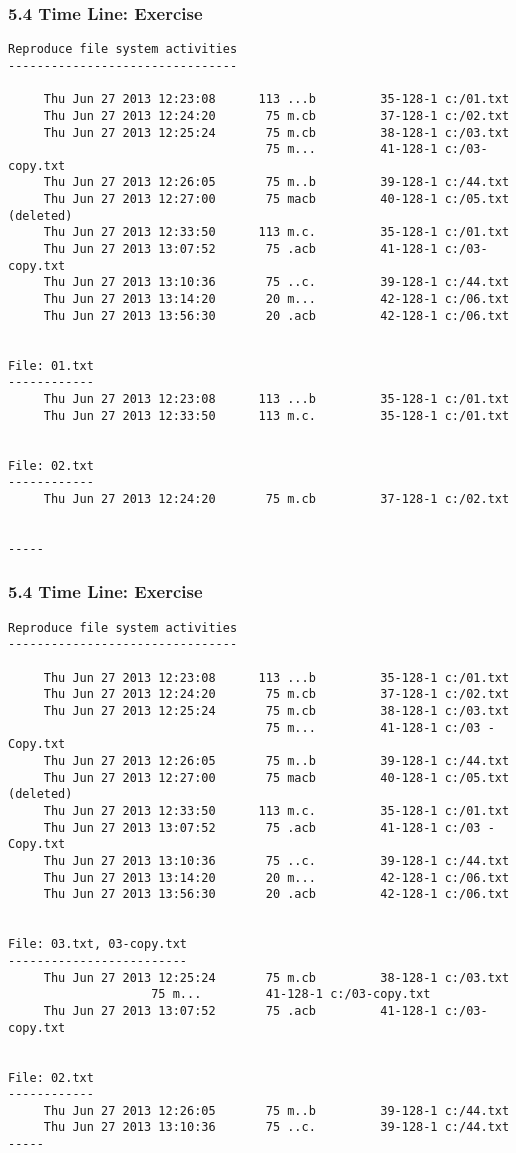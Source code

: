 \begin{frame}[fragile]
  \frametitle{5.4 Time Line: Exercise}
  \begin{lstlisting}[basicstyle=\tiny]
Reproduce file system activities
--------------------------------
  
     Thu Jun 27 2013 12:23:08      113 ...b         35-128-1 c:/01.txt
     Thu Jun 27 2013 12:24:20       75 m.cb         37-128-1 c:/02.txt
     Thu Jun 27 2013 12:25:24       75 m.cb         38-128-1 c:/03.txt
                                    75 m...         41-128-1 c:/03-copy.txt
     Thu Jun 27 2013 12:26:05       75 m..b         39-128-1 c:/44.txt
     Thu Jun 27 2013 12:27:00       75 macb         40-128-1 c:/05.txt (deleted)
     Thu Jun 27 2013 12:33:50      113 m.c.         35-128-1 c:/01.txt
     Thu Jun 27 2013 13:07:52       75 .acb         41-128-1 c:/03-copy.txt
     Thu Jun 27 2013 13:10:36       75 ..c.         39-128-1 c:/44.txt
     Thu Jun 27 2013 13:14:20       20 m...         42-128-1 c:/06.txt
     Thu Jun 27 2013 13:56:30       20 .acb         42-128-1 c:/06.txt


File: 01.txt
------------
     Thu Jun 27 2013 12:23:08      113 ...b         35-128-1 c:/01.txt
     Thu Jun 27 2013 12:33:50      113 m.c.         35-128-1 c:/01.txt


File: 02.txt
------------
     Thu Jun 27 2013 12:24:20       75 m.cb         37-128-1 c:/02.txt


-----
  \end{lstlisting}
\end{frame}


\begin{frame}[fragile]
  \frametitle{5.4 Time Line: Exercise}
  \begin{lstlisting}[basicstyle=\tiny]
Reproduce file system activities
--------------------------------
  
     Thu Jun 27 2013 12:23:08      113 ...b         35-128-1 c:/01.txt
     Thu Jun 27 2013 12:24:20       75 m.cb         37-128-1 c:/02.txt
     Thu Jun 27 2013 12:25:24       75 m.cb         38-128-1 c:/03.txt
                                    75 m...         41-128-1 c:/03 - Copy.txt
     Thu Jun 27 2013 12:26:05       75 m..b         39-128-1 c:/44.txt
     Thu Jun 27 2013 12:27:00       75 macb         40-128-1 c:/05.txt (deleted)
     Thu Jun 27 2013 12:33:50      113 m.c.         35-128-1 c:/01.txt
     Thu Jun 27 2013 13:07:52       75 .acb         41-128-1 c:/03 - Copy.txt
     Thu Jun 27 2013 13:10:36       75 ..c.         39-128-1 c:/44.txt
     Thu Jun 27 2013 13:14:20       20 m...         42-128-1 c:/06.txt
     Thu Jun 27 2013 13:56:30       20 .acb         42-128-1 c:/06.txt


File: 03.txt, 03-copy.txt
-------------------------
     Thu Jun 27 2013 12:25:24       75 m.cb         38-128-1 c:/03.txt
				    75 m...         41-128-1 c:/03-copy.txt
     Thu Jun 27 2013 13:07:52       75 .acb         41-128-1 c:/03-copy.txt


File: 02.txt
------------
     Thu Jun 27 2013 12:26:05       75 m..b         39-128-1 c:/44.txt
     Thu Jun 27 2013 13:10:36       75 ..c.         39-128-1 c:/44.txt
-----
  \end{lstlisting}
\end{frame}


